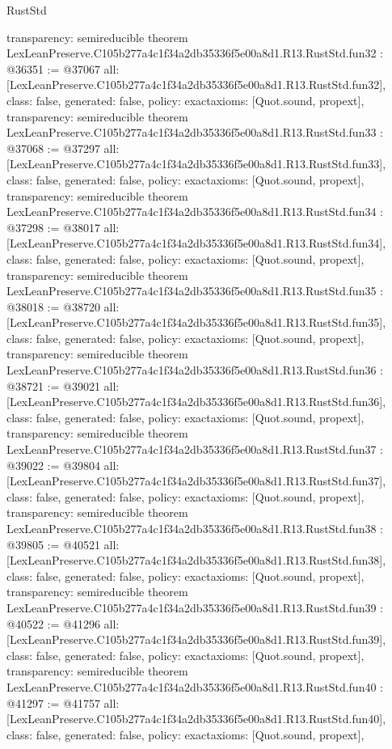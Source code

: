 \begin{lexlean}{RustStd}
\begin{coremodule}
{  transparency: semireducible
}
theorem LexLeanPreserve.C105b277a4c1f34a2db35336f5e00a8d1.R13.RustStd.fun32 : @36351 := @37067 {
  all: [LexLeanPreserve.C105b277a4c1f34a2db35336f5e00a8d1.R13.RustStd.fun32],
  class: false,
  generated: false,
  policy: exact{axioms: [Quot.sound, propext]},
  transparency: semireducible
}
theorem LexLeanPreserve.C105b277a4c1f34a2db35336f5e00a8d1.R13.RustStd.fun33 : @37068 := @37297 {
  all: [LexLeanPreserve.C105b277a4c1f34a2db35336f5e00a8d1.R13.RustStd.fun33],
  class: false,
  generated: false,
  policy: exact{axioms: [Quot.sound, propext]},
  transparency: semireducible
}
theorem LexLeanPreserve.C105b277a4c1f34a2db35336f5e00a8d1.R13.RustStd.fun34 : @37298 := @38017 {
  all: [LexLeanPreserve.C105b277a4c1f34a2db35336f5e00a8d1.R13.RustStd.fun34],
  class: false,
  generated: false,
  policy: exact{axioms: [Quot.sound, propext]},
  transparency: semireducible
}
theorem LexLeanPreserve.C105b277a4c1f34a2db35336f5e00a8d1.R13.RustStd.fun35 : @38018 := @38720 {
  all: [LexLeanPreserve.C105b277a4c1f34a2db35336f5e00a8d1.R13.RustStd.fun35],
  class: false,
  generated: false,
  policy: exact{axioms: [Quot.sound, propext]},
  transparency: semireducible
}
theorem LexLeanPreserve.C105b277a4c1f34a2db35336f5e00a8d1.R13.RustStd.fun36 : @38721 := @39021 {
  all: [LexLeanPreserve.C105b277a4c1f34a2db35336f5e00a8d1.R13.RustStd.fun36],
  class: false,
  generated: false,
  policy: exact{axioms: [Quot.sound, propext]},
  transparency: semireducible
}
theorem LexLeanPreserve.C105b277a4c1f34a2db35336f5e00a8d1.R13.RustStd.fun37 : @39022 := @39804 {
  all: [LexLeanPreserve.C105b277a4c1f34a2db35336f5e00a8d1.R13.RustStd.fun37],
  class: false,
  generated: false,
  policy: exact{axioms: [Quot.sound, propext]},
  transparency: semireducible
}
theorem LexLeanPreserve.C105b277a4c1f34a2db35336f5e00a8d1.R13.RustStd.fun38 : @39805 := @40521 {
  all: [LexLeanPreserve.C105b277a4c1f34a2db35336f5e00a8d1.R13.RustStd.fun38],
  class: false,
  generated: false,
  policy: exact{axioms: [Quot.sound, propext]},
  transparency: semireducible
}
theorem LexLeanPreserve.C105b277a4c1f34a2db35336f5e00a8d1.R13.RustStd.fun39 : @40522 := @41296 {
  all: [LexLeanPreserve.C105b277a4c1f34a2db35336f5e00a8d1.R13.RustStd.fun39],
  class: false,
  generated: false,
  policy: exact{axioms: [Quot.sound, propext]},
  transparency: semireducible
}
theorem LexLeanPreserve.C105b277a4c1f34a2db35336f5e00a8d1.R13.RustStd.fun40 : @41297 := @41757 {
  all: [LexLeanPreserve.C105b277a4c1f34a2db35336f5e00a8d1.R13.RustStd.fun40],
  class: false,
  generated: false,
  policy: exact{axioms: [Quot.sound, propext]},
}
\end{coremodule}
\end{lexlean}
